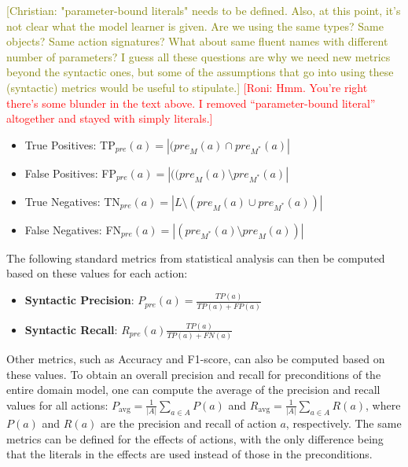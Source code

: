 \documentclass{article}
\theoremstyle{definition}
\theoremstyle{remark}
\newcommand{\realm}{\ensuremath{M^*}\xspace}
\newcommand{\pre}{\ensuremath{\textit{pre}}\xspace}
\newcommand{\eff}{\ensuremath{\textit{eff}}\xspace}
\newcommand{\roni}[1]{{\textcolor{red}{[Roni: #1]}}}
\newcommand{\cm}[1]{{\textcolor{olive}{[Christian: #1]}}}
\begin{document}
\cm{"parameter-bound literals" needs to be defined. Also, at this point, it's not clear what the model learner is given. Are we using the same types? Same objects? Same action signatures? What about same fluent names with different number of parameters? I guess all these questions are why we need new metrics beyond the syntactic ones, but some of the assumptions that go into using these (syntactic) metrics would be useful to stipulate.}
\roni{Hmm. You're right there's some blunder in the text above. I removed ``parameter-bound literal'' altogether and stayed with simply literals.}

 \begin{itemize}
    \item True Positives: TP$_\pre(a)=|(\pre_M(a)\cap \pre_\realm(a)|$
    \item False Positives: FP$_\pre(a)=|((\pre_M(a)\setminus \pre_\realm(a)|$
    \item True Negatives: TN$_\pre(a)=|L \setminus(\pre_M(a)\cup \pre_\realm(a))|$
    \item False Negatives: FN$_\pre(a)=|(\pre_\realm(a)\setminus \pre_M(a))|$
\end{itemize}
The following standard metrics from statistical analysis can then be computed based on these values for each action:
\begin{itemize}
    \item \textbf{Syntactic Precision}: $P_\pre(a)=\frac{TP(a)}{TP(a)+FP(a)}$
    \item \textbf{Syntactic Recall}: $R_\pre(a)\frac{TP(a)}{TP(a)+FN(a)}$
\end{itemize}
Other metrics, such as Accuracy and F1-score, can also be computed based on these values. 
To obtain an overall precision and recall for preconditions of the entire domain model, one can compute the average of the precision and recall values for all actions:
$P_\text{avg}=\frac{1}{|A|}\sum_{a\in A} P(a)$ and $R_\text{avg}=\frac{1}{|A|}\sum_{a\in A} R(a)$, where $P(a)$ and $R(a)$ are the precision and recall of action $a$, respectively. 
The same metrics can be defined for the effects of actions, with the only difference being that the literals in the effects are used instead of those in the preconditions. 
\end{document}

